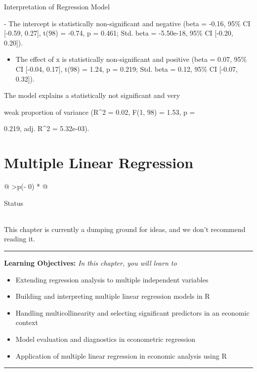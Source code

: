 \documentclass[
  letterpaper,
  twoside,
  openright,
  headsepline,
  footsepline,
  listof = totocnumbered,
  chapterprefix = true,
  titlepage = false]{scrbook}
\providecommand{\tightlist}{%
  \setlength{\itemsep}{0pt}\setlength{\parskip}{0pt}}\usepackage{longtable,booktabs,array}
\providecommand{\abstractname}{Learning Objectives} %
\newenvironment{objectives}[1]{%
	\hrule
	\vspace{5pt}
	\small\textbf{\abstractname: } 
	\newline
	\vspace{0.1cm}
	\small\emph{#1} %
	\itshape %
}{%
	\vspace{5pt}
	\hrule
	\vspace{0.6cm}
}
\begin{document}
Interpretation of Regression Model

- The intercept is statistically non-significant and negative (beta =
-0.16, 95\% CI {[}-0.59, 0.27{]}, t(98) = -0.74, p = 0.461; Std. beta =
-5.50e-18, 95\% CI {[}-0.20, 0.20{]}).

\begin{itemize}
\tightlist
\item
  The effect of x is statistically non-significant and positive (beta =
  0.07, 95\% CI {[}-0.04, 0.17{]}, t(98) = 1.24, p = 0.219; Std. beta =
  0.12, 95\% CI {[}-0.07, 0.32{]}).
\end{itemize}

The model explains a statistically not significant and very

weak proportion of variance (R\^{}2 = 0.02, F(1, 98) = 1.53, p =

0.219, adj. R\^{}2 = 5.32e-03).


\hypertarget{multiple-linear-regression}{%
\chapter{Multiple Linear Regression}\label{multiple-linear-regression}}

\begin{longtable}[]{@{}
  >{\centering\arraybackslash}p{(\columnwidth - 0\tabcolsep) * }@{}}
\toprule\noalign{}
\begin{minipage}[b]{\linewidth}\centering
Status
\end{minipage} \\
\midrule\noalign{}
\endhead
\bottomrule\noalign{}
\endlastfoot
This chapter is currently a dumping ground for ideas, and we don't
recommend reading it. \\
\end{longtable}

\begin{objectives}{In this chapter, you will learn to}
\begin{itemize}

\item{Extending regression analysis to multiple independent variables}

\item{Building and interpreting multiple linear regression models in R}

\item{Handling multicollinearity and selecting significant predictors in an economic context}

\item{Model evaluation and diagnostics in econometric regression}

\item{Application of multiple linear regression in economic analysis using R}

\end{itemize}

\end{objectives}
\end{document}
